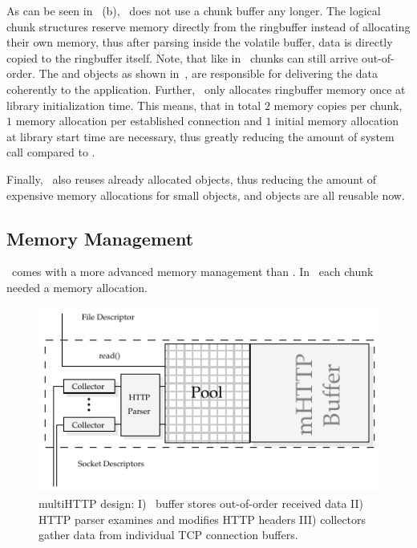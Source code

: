 As can be seen in~ (b), \protonew~does not use a chunk buffer any longer. 
The logical chunk structures reserve memory directly from the ringbuffer instead of allocating their own memory, thus after parsing inside the volatile buffer, data is directly copied to the ringbuffer itself. 
Note, that like in \protoold~chunks can still arrive out-of-order. 
The  and  objects as shown in~, are responsible for delivering the data coherently to the application. 
Further, \protonew~only allocates ringbuffer memory once at library initialization time. 
This means, that in total $2$ memory copies per chunk, $1$ memory allocation per established connection and $1$ initial memory allocation at library start time are necessary, thus greatly reducing the amount of system call compared to \protoold. 

Finally, \protonew~also reuses already allocated objects, thus reducing the amount of expensive memory allocations for small objects, \ie {} and  objects are all reusable now. 

\subsection{Memory Management}
\label{sec:memory-management}

\protonew~comes with a more advanced memory management than \protoold. 
In \protoold~each chunk needed a memory allocation. 

\begin{figure}[!htb]
        \begin{minipage}[t]{0.8\linewidth}
		\begin{center}
                \includegraphics[width=\linewidth]{Figures/design-buffer.pdf}
				\caption{\label{fig:implementation-memory-management}multiHTTP design: I) \mhttp~buffer stores out-of-order received data II) HTTP parser examines and modifies HTTP headers III) collectors gather data from individual TCP connection buffers.}
        \end{center}
        \end{minipage}
  \vspace*{-0.3cm}
\end{figure}

